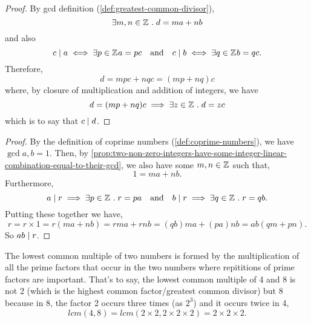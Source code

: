 \documentclass[../MathsNotesBase.tex]{subfiles}
\begin{document}
{		\bigskip
		\begin{proof}
			By gcd definition (\ref{def:greatest-common-divisor}),
			\[ \exists m,n \in \mathbb{Z}^{} \;.\; d = ma + nb \]
			and also
			\[  c \mid a \iff \exists p \in \mathbb{Z}^{} a = pc \hspace{10pt}\text{and}\hspace{10pt} c \mid b \iff \exists q \in \mathbb{Z}^{} b = qc. \]
			Therefore,
			\[ d = mpc + nqc = (mp + nq)c \]
			where, by closure of multiplication and addition of integers, we have
			\[ d = (mp + nq)c \implies \exists z \in \mathbb{Z}^{} \;.\; d = zc \]
			which is to say that ${ c \mid d }$.
		\end{proof}
		
		\bigskip
		\begin{proof}
			By the definition of coprime numbers (\ref{def:coprime-numbers}), we have ${ \operatorname{gcd} a,b = 1 }$. Then, by \autoref{prop:two-non-zero-integers-have-some-integer-linear-combination-equal-to-their-gcd}, we also have some ${ m,n \in \mathbb{Z}^{} }$ such that,
			\[ 1 = ma + nb. \]
			Furthermore,
			\[ a \mid r \implies \exists p \in \mathbb{Z}^{} \;.\; r = pa \hspace{10pt}\text{and}\hspace{10pt} b \mid r \implies \exists q \in \mathbb{Z}^{} \;.\; r = qb. \]
			Putting these together we have,
			\[ r = r \times 1 = r(ma + nb) = rma + rnb = (qb)ma + (pa)nb = ab(qm + pn). \]
			So ${ ab \mid r }$.
		\end{proof}
		
		
		\biggerskip
		\label{sssec:lowest_common_multiple}
		\nl[2]
		The lowest common multiple of two numbers is formed by the multiplication of all the prime factors that occur in the two numbers where repititions of prime factors are important. That's to say, the lowest common multiple of 4 and 8 is not 2 (which is the highest common factor/greatest common divisor) but 8 because in 8, the factor 2 occurs three times (as $2^3$) and it occurs twice in 4,
		\[ lcm(4,8) = lcm(2\times2, 2\times2\times2) = 2\times2\times2. \]
		
}
\end{document}
